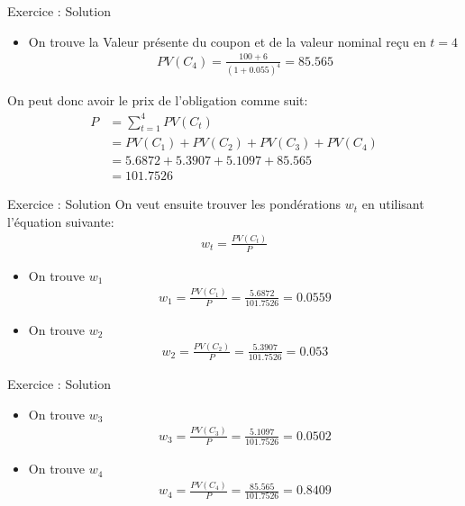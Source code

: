 \documentclass{beamer}
\begin{document}
\begin{frame}{Exercice : Solution}
\begin{itemize}[label=\bullet]
\item On trouve la Valeur présente du coupon et de la valeur nominal reçu en $t=4$
\begin{align*}
PV(C_4)=\frac{100+6}{(1+0.055)^4}=85.565  
\end{align*}
\end{itemize}
On peut donc avoir le prix de l'obligation comme suit:
\begin{align*}
P&=\sum_{t=1}^4 PV(C_t)\\
&=PV(C_1)+PV(C_2)+PV(C_3)+PV(C_4) \\
&= 5.6872 + 5.3907+5.1097+85.565 \\
&=101.7526
\end{align*}
\end{frame}
\begin{frame}{Exercice : Solution}
On veut ensuite trouver les pondérations $w_t$ en utilisant l'équation suivante: 
\begin{align*}
w_t=\frac{PV(C_t)}{P}
\end{align*}
\begin{itemize}[label=\bullet]
\item On trouve $w_1$
\begin{align*}
w_1=\frac{PV(C_1)}{P}=\frac{5.6872 }{101.7526}=0.0559                           
\end{align*} 
\item On trouve $w_2$
\begin{align*}
w_2=\frac{PV(C_2)}{P}=\frac{5.3907}{101.7526}=0.053                                          
\end{align*} 
\end{itemize}
\end{frame}
\begin{frame}{Exercice : Solution}
\begin{itemize}[label=\bullet]
\item On trouve $w_3$
\begin{align*}
w_3=\frac{PV(C_3)}{P}=\frac{5.1097 }{101.7526}=0.0502                                             
\end{align*} 
\item On trouve $w_4$
\begin{align*}
w_4=\frac{PV(C_4)}{P}=\frac{85.565}{101.7526}=0.8409                                                     
\end{align*} 
\end{itemize}
\end{frame}
\end{document}
